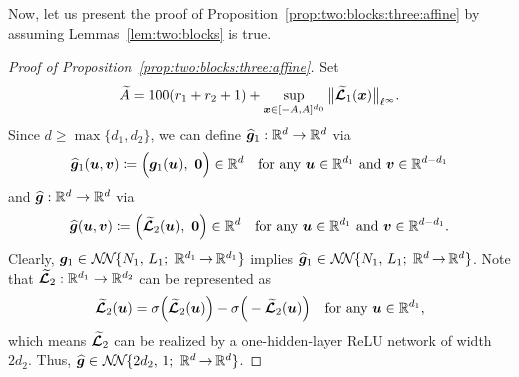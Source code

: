 \documentclass[nohyperref]{article}
\theoremstyle{plain}
\theoremstyle{definition}
\theoremstyle{remark}
\begin{document}
Now, let us present the proof of Proposition~\ref{prop:two:blocks:three:affine} by assuming Lemmas~\ref{lem:two:blocks} is true.
\begin{proof}[Proof of Proposition~\ref{prop:two:blocks:three:affine}]
	Set 
	\begin{equation*}
		{\widetilde{A}}=100(r_1+r_2+1)+ \sup_{{\bm{x}}\in [-A,A]^{d_0}}\big\|{\bm{\mathcal{\widetilde{L}}}}_1({\bm{x}})\big\|_{\ell^\infty}.
	\end{equation*}
	Since $d\ge \max\{d_1,d_2\}$, we can define $\bmhatg_1:\R^d\to\R^d$ via
	\begin{equation*}
		\bmhatg_1(\bmu,\bmv)\coloneqq \Big(\bmg_1(\bmu),\   \bmzero\Big)\in\R^d\quad\tn{for any $\bmu\in \R^{d_1}$ and $\bmv\in \R^{d-d_1}$}
	\end{equation*}
	and $\bmhatg:\R^d\to\R^d$ via
	\begin{equation*}
		\bmhatg(\bmu,\bmv)\coloneqq \Big(\bmtildecalL_2(\bmu),\   \bmzero\Big)\in\R^d\quad\tn{for any $\bmu\in \R^{d_1}$ and $\bmv\in \R^{d-d_1}$}.
	\end{equation*}
	Clearly, $\bmg_1\in \nn{N_1}{L_1}{d_1}{d_1}$ implies 
	$\bmhatg_1\in \nn{N_1}{L_1}{d}{d}$. Note that
	$\bmtildecalL_2:\R^{d_1}\to\R^{d_2}$ can be represented as 
	\begin{equation*}
		\bmtildecalL_2(\bmu)=\sigma\Big(\bmtildecalL_2(\bmu)\Big)-
		\sigma\Big(-\bmtildecalL_2(\bmu)\Big) \quad \tn{for any $\bmu\in \R^{d_1}$},
	\end{equation*} 
	which means ${\bm{\mathcal{\widetilde{L}}}}_2$ can be realized by a one-hidden-layer ReLU network of width $2d_2$. Thus,  $\bmhatg\in \nn{2d_2}{1}{d}{d}$.
	

\end{proof}
\end{document}
